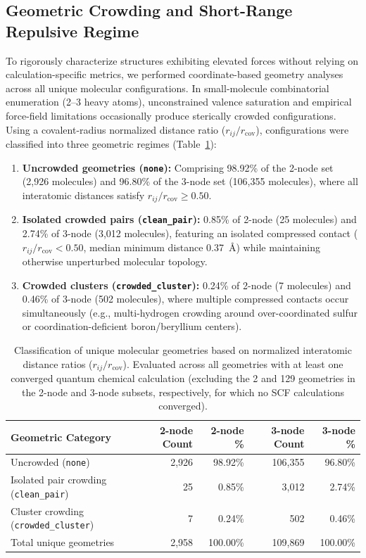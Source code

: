 \documentclass[fleqn,10pt]{article}
\begin{document}
\subsection*{Geometric Crowding and Short-Range Repulsive Regime}

To rigorously characterize structures exhibiting elevated forces without relying on calculation-specific metrics, we performed coordinate-based geometry analyses across all unique molecular configurations. In small-molecule combinatorial enumeration (2--3 heavy atoms), unconstrained valence saturation and empirical force-field limitations occasionally produce sterically crowded configurations. Using a covalent-radius normalized distance ratio ($r_{ij} / r_{\text{cov}}$), configurations were classified into three geometric regimes (Table~\ref{tab:crowding_stats}):
\begin{enumerate}
\item \textbf{Uncrowded geometries (\texttt{none}):} Comprising 98.92\% of the 2-node set (2,926 molecules) and 96.80\% of the 3-node set (106,355 molecules), where all interatomic distances satisfy $r_{ij} / r_{\text{cov}} \ge 0.50$.
\item \textbf{Isolated crowded pairs (\texttt{clean\_pair}):} 0.85\% of 2-node (25 molecules) and 2.74\% of 3-node (3,012 molecules), featuring an isolated compressed contact ($r_{ij} / r_{\text{cov}} < 0.50$, median minimum distance 0.37~\AA{}) while maintaining otherwise unperturbed molecular topology.
\item \textbf{Crowded clusters (\texttt{crowded\_cluster}):} 0.24\% of 2-node (7 molecules) and 0.46\% of 3-node (502 molecules), where multiple compressed contacts occur simultaneously (e.g., multi-hydrogen crowding around over-coordinated sulfur or coordination-deficient boron/beryllium centers).
\end{enumerate}

\begin{table}[ht!]
\centering
\begin{tabular}{lrrrr}
\toprule
Geometric Category & 2-node Count & 2-node \% & 3-node Count & 3-node \% \\
\midrule
Uncrowded (\texttt{none}) & 2,926 & 98.92\% & 106,355 & 96.80\% \\
Isolated pair crowding (\texttt{clean\_pair}) & 25 & 0.85\% & 3,012 & 2.74\% \\
Cluster crowding (\texttt{crowded\_cluster}) & 7 & 0.24\% & 502 & 0.46\% \\
\midrule
Total unique geometries & 2,958 & 100.00\% & 109,869 & 100.00\% \\
\bottomrule
\end{tabular}
\caption{Classification of unique molecular geometries based on normalized interatomic distance ratios ($r_{ij} / r_{\text{cov}}$). Evaluated across all geometries with at least one converged quantum chemical calculation (excluding the 2 and 129 geometries in the 2-node and 3-node subsets, respectively, for which no SCF calculations converged).}
\label{tab:crowding_stats}
\end{table}
\end{document}
